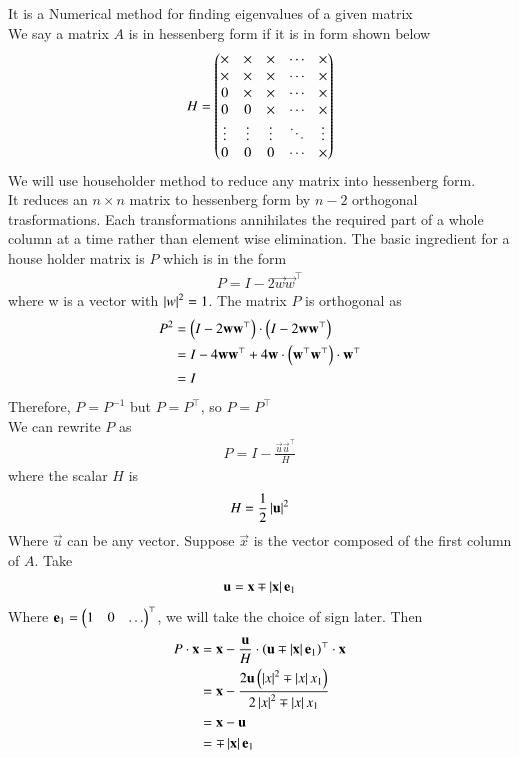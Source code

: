 \documentclass[journal]{IEEEtran}
\begin{document}
It is a Numerical method for finding eigenvalues of a given matrix\\
We say a matrix $A$ is in hessenberg form if it is in form shown below
\begin{align}
H = 
\begin{pmatrix}
\times & \times & \times & \cdots & \times \\
\times & \times & \times & \cdots & \times \\
0      & \times & \times & \cdots & \times \\
0      & 0      & \times & \cdots & \times \\
\vdots & \vdots & \vdots & \ddots & \vdots \\
0      & 0      & 0      & \cdots & \times
\end{pmatrix}
\end{align}
We will use householder method to reduce any matrix into hessenberg form.\\
It reduces an $n\times n$ matrix to hessenberg form by $n-2$ orthogonal trasformations. Each transformations annihilates the required part of a whole column at a time rather than element wise elimination. The basic ingredient for a house holder matrix is $P$ which is in the form
\begin{align}
	P = I-2\vec{w}\vec{w}^\top
\end{align}
where w is a vector with $\left\vert w\right\vert^2=1$. The matrix $P$ is orthogonal as
\begin{align}
P^2 &=\left(I - 2\mathbf{w}\mathbf{w}^\top\right)\cdot\left(I - 2\mathbf{w}\mathbf{w}^\top\right)\\
    &=I-4\mathbf{w}\mathbf{w}^\top + 4\mathbf{w}\cdot\left(\mathbf{w}^\top\mathbf{w}^\top\right)\cdot\mathbf{w}^\top\\
    &=I
\end{align}
Therefore, $P=P^{-1}$ but $P = P^\top$, so $P = P^\top$ \\
We can rewrite $P$ as
\begin{align}
	P = I - \frac{\vec{u}\vec{u}^\top}{H}
\end{align}
where the scalar $H$ is
\begin{align}
H = \frac{1}{2}\left\vert\mathbf{u}\right\vert^2
\end{align}
Where $\vec{u}$ can be any vector. Suppose $\vec{x}$ is the vector composed of the first column of $A$. Take
\begin{align}
	\mathbf{u} = \mathbf{x} \mp \left\vert\mathbf{x}\right\vert\mathbf{e}_1
\end{align}
Where $\mathbf{e}_1 = \begin{pmatrix}1 & 0 & \dots\end{pmatrix}^\top$, we will take the choice of sign later. Then
\begin{align}
	P\cdot\mathbf{x} &= \mathbf{x} - \frac{\mathbf{u}}{H}\cdot\left(\mathbf{u}\mp \left\vert\mathbf{x}\right\vert\mathbf{e}_1\right)^\top\cdot \mathbf{x}\\
	              &= \mathbf{x} - \frac{2\mathbf{u}\left(\left\vert x\right\vert^2\mp \left\vert x\right\vert x_1\right)}{2\left\vert x\right\vert^2\mp \left\vert x\right\vert x_1}\\
	              &= \mathbf{x} - \mathbf{u}\\
	              &= \mp\left\vert\mathbf{x}\right\vert\mathbf{e}_1
\end{align}
\end{document}
